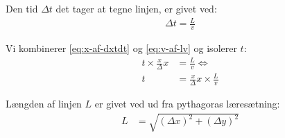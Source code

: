 

Den tid $\Delta t$ det tager at tegne linjen, er givet ved:
\begin{align}
\Delta t = \frac Lv \label{eq:v-af-lv}
\end{align}

Vi kombinerer \eqref{eq:x-af-dxtdt} og \eqref{eq:v-af-lv} og isolerer
$t$:
\begin{align}
t \times \frac{x}\Delta x &= \frac Lv \Leftrightarrow \\
t &= \frac{x}\Delta x \times \frac Lv \label{eq:t-af-dxxlv}
\end{align}

Længden af linjen $L$ er givet ved ud fra pythagoras læresætning:
\begin{align}
L &= \sqrt{\left(\Delta x\right)^2 + \left(\Delta y\right)^2}
\end{align}

